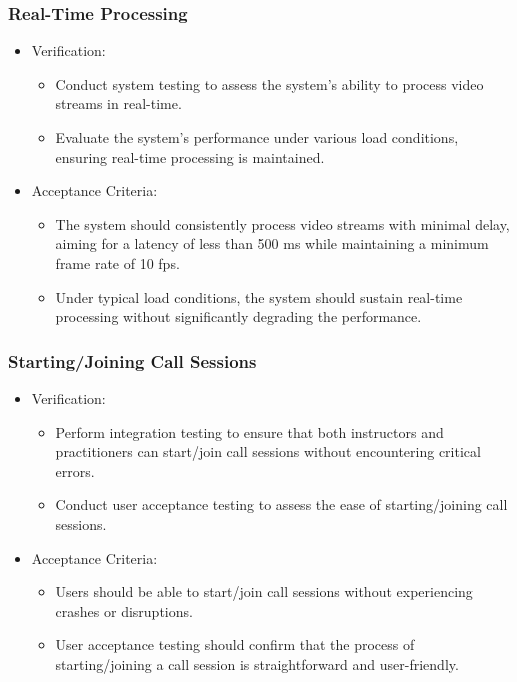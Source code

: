 \documentclass[12pt]{article}
\begin{document}
\subsubsection{Real-Time Processing}
\begin{itemize}
    \item Verification:
        \begin{itemize}
            \item Conduct system testing to assess the system’s ability to process video streams in real-time.
            \item Evaluate the system’s performance under various load conditions, ensuring real-time processing is maintained.
        \end{itemize}
    \item Acceptance Criteria:
        \begin{itemize}
            \item The system should consistently process video streams with minimal delay, aiming for a latency of less than 500 ms while maintaining a minimum frame rate of 10 fps.
            \item Under typical load conditions, the system should sustain real-time processing without significantly degrading the performance.
        \end{itemize}
\end{itemize}
\subsubsection{Starting/Joining Call Sessions}
\begin{itemize}
    \item Verification:
        \begin{itemize}
            \item Perform integration testing to ensure that both instructors and practitioners can start/join call sessions without encountering critical errors.
            \item Conduct user acceptance testing to assess the ease of starting/joining call sessions.
        \end{itemize}
    \item Acceptance Criteria:
        \begin{itemize}
            \item Users should be able to start/join call sessions without experiencing crashes or disruptions.
            \item User acceptance testing should confirm that the process of starting/joining a call session is straightforward and user-friendly.
        \end{itemize}
\end{itemize}
\end{document}

